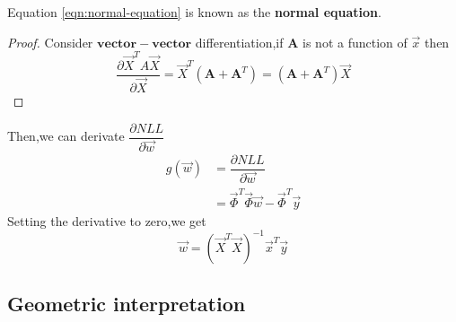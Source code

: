 Equation \ref{eqn:normal-equation} is known as the \textbf{normal equation}.
\begin{proof}
Consider $\mathbf{vector-vector}$ differentiation,if $\mathbf{A}$ is not a function of $\vec{x}$ then
\begin{equation}
\dfrac{\partial\vec{X}^TA\vec{X}}{\partial\vec{X}} = \vec{X}^T(\mathbf{A}+\mathbf{A}^T) = (\mathbf{A}+\mathbf{A}^T)\vec{X}
\end{equation}
\end{proof}
Then,we can derivate $\dfrac{\partial NLL}{\partial \vec{w}}$
\begin{eqnarray}
g(\vec{w}) &= \dfrac{\partial NLL}{\partial\vec{w}} \\
&=\vec{\Phi}^T\vec{\Phi}\vec{w} - \vec{\Phi}^T\vec{y}			
\end{eqnarray}
Setting the derivative to zero,we get
\begin{equation}
	\vec{w} = (\vec{X}^T\vec{X})^{-1}\vec{x}^T\vec{y}
\end{equation}

\subsection{Geometric interpretation}

